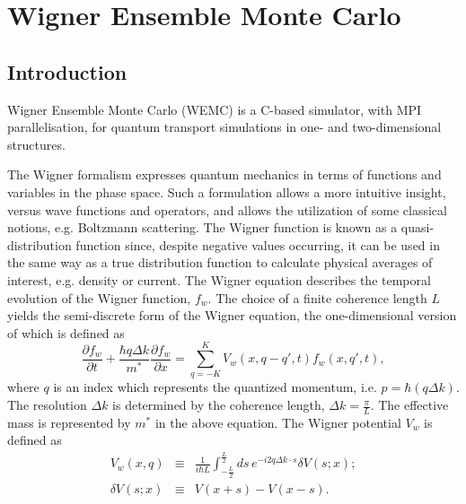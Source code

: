 
\chapter{Wigner Ensemble Monte Carlo}   %

\section{Introduction}
Wigner Ensemble Monte Carlo (WEMC) is a C-based simulator, with MPI parallelisation, for quantum transport simulations in one- and two-dimensional structures.

The Wigner formalism expresses quantum mechanics in terms of functions and variables in the phase space. Such a formulation allows a more intuitive insight, versus wave functions and operators, and allows the utilization of some classical notions, e.g. Boltzmann scattering. The Wigner function is known as a quasi-distribution function since, despite negative values occurring, it can be used in the same way as a true distribution function to calculate physical averages of interest, e.g. density or current. The Wigner equation describes the temporal evolution of the Wigner function, $f_w$. The choice of a finite coherence length $L$ \cite{signParticle2D} yields the semi-discrete form of the Wigner equation, the one-dimensional version of which is defined as
\begin{equation}
\frac{\partial f_{w}}{\partial t}+\frac{\hbar q\Delta k}{m^{*}}\frac{\partial f_{w}}{\partial x}={\displaystyle \sum_{q=-K}^{K}V_{w}\left(x,q-q',t\right)f_{w}\left(x,q',t\right)},\label{eq:semi-discrete-wigner-eq}
\end{equation}
where $q$ is an index which represents the quantized momentum, i.e. $p=\hbar\left(q\Delta k\right)$. The resolution $\Delta k$ is determined by the coherence length, $\Delta k=\frac{\pi}{L}$. The effective mass is represented by $m^*$ in the above equation. The Wigner potential $V_w$ is defined as
\begin{eqnarray}
V_{w}\left(x,q\right) & \equiv & \frac{1}{i\hbar L}\int_{-\frac{L}{2}}^{\frac{L}{2}}ds\, e^{-i2q\Delta k\cdot s}\delta V\left(s;x\right);\label{eq:semi-discrete-wigner-potential}\\
\delta V\left(s;x\right) & \equiv & V\left(x+s\right)-V\left(x-s\right).\nonumber
\end{eqnarray}

